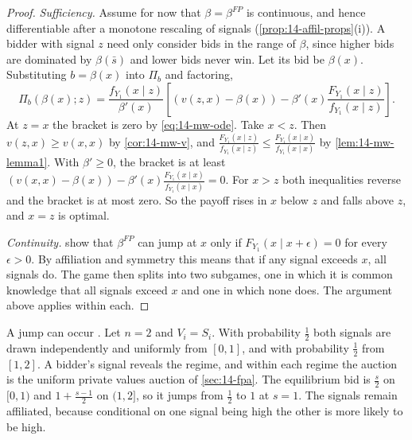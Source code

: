 \begin{proof}
\emph{Sufficiency.} Assume for now that $\beta=\beta^{FP}$ is continuous, and hence differentiable after a monotone
rescaling of signals (\cref{prop:14-affil-props}(i)). A bidder with signal $z$ need only consider bids in
the range of $\beta$, since higher bids are dominated by $\beta(\bar s)$ and lower bids never win. Let its bid be
$\beta(x)$. Substituting $b=\beta(x)$ into $\Pi_b$ and factoring,
\begin{equation*}
  \Pi_b(\beta(x);z)=\frac{f_{Y_1}(x\mid z)}{\beta'(x)}
  \left[\left(v(z,x)-\beta(x)\right)-\beta'(x)\frac{F_{Y_1}(x\mid z)}{f_{Y_1}(x\mid z)}\right].
\end{equation*}
At $z=x$ the bracket is zero by \eqref{eq:14-mw-ode}. Take $x<z$. Then $v(z,x)\ge v(x,x)$ by
\cref{cor:14-mw-v}, and $\frac{F_{Y_1}(x\mid z)}{f_{Y_1}(x\mid z)}\le\frac{F_{Y_1}(x\mid x)}{f_{Y_1}(x\mid x)}$
by \cref{lem:14-mw-lemma1}. With $\beta'\ge0$, the bracket is at least
$(v(x,x)-\beta(x))-\beta'(x)\frac{F_{Y_1}(x\mid x)}{f_{Y_1}(x\mid x)}=0$. For $x>z$ both inequalities reverse
and the bracket is at most zero. So the payoff rises in $x$ below $z$ and falls above $z$, and $x=z$ is
optimal.

\emph{Continuity.} \citet[p.~1108]{MilgromWeber1982} show that $\beta^{FP}$ can jump at $x$ only if
$F_{Y_1}(x\mid x+\epsilon)=0$ for every $\epsilon>0$. By affiliation and symmetry this means that if any signal
exceeds $x$, all signals do. The game then splits into two subgames, one in which it is common knowledge that
all signals exceed $x$ and one in which none does. The argument above applies within each.
\end{proof}

A jump can occur \citep[footnote~21]{MilgromWeber1982}. Let $n=2$ and $V_i=S_i$. With probability
$\frac{1}{2}$ both signals are drawn independently and uniformly from $[0,1]$, and with probability
$\frac{1}{2}$ from $[1,2]$. A bidder's signal reveals the regime, and within each regime the auction is the
uniform private values auction of \cref{sec:14-fpa}. The equilibrium bid is $\frac{s}{2}$ on $[0,1)$ and
$1+\frac{s-1}{2}$ on $(1,2]$, so it jumps from $\frac{1}{2}$ to $1$ at $s=1$. The signals remain affiliated,
because conditional on one signal being high the other is more likely to be high.


